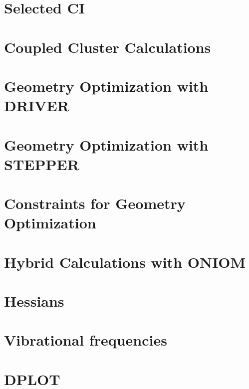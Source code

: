 \chapter{Selected CI}


\chapter{Coupled Cluster Calculations}


%


\chapter{Geometry Optimization with DRIVER}


\chapter{Geometry Optimization with STEPPER}


\chapter{Constraints for Geometry Optimization}



\chapter{Hybrid Calculations with ONIOM}


\chapter{Hessians}


\chapter{Vibrational frequencies}


\chapter{DPLOT}


